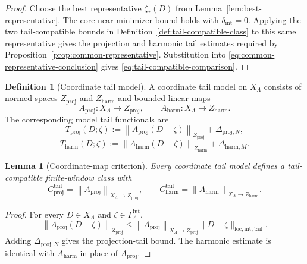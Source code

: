 \documentclass[11pt]{article}
\numberwithin{equation}{section}
\newtheorem{lemma}[lemma]{Lemma}
\theoremstyle{definition}
\newtheorem{definition}[definition]{Definition}
\theoremstyle{remark}
\newcommand{\loc}{\mathrm{loc}}
\newcommand{\intg}{\mathrm{int}}
\newcommand{\tail}{\mathrm{tail}}
\newcommand{\proj}{\mathrm{proj}}
\newcommand{\harm}{\mathrm{harm}}
\newcommand{\norm}[2]{\left\|#1\right\|_{#2}}
\newcommand{\Gammaint}{\Gamma^{\intg}_{\Lambda}}
\begin{document}
\begin{proof}
Choose the best representative $\zeta_*(D)$ from Lemma~\ref{lem:best-representative}.  The core
near-minimizer bound holds with $\delta_{\intg}=0$.  Applying the two tail-compatible
bounds in Definition~\ref{def:tail-compatible-class} to this same representative gives the projection
and harmonic tail estimates required by Proposition~\ref{prop:common-representative}.  Substitution
into \eqref{eq:common-representative-conclusion} gives \eqref{eq:tail-compatible-comparison}.
\end{proof}

\begin{definition}[Coordinate tail model]\label{def:coordinate-tail-model}
A coordinate tail model on $X_\Lambda$ consists of normed spaces $Z_{\proj}$ and
$Z_{\harm}$ and bounded linear maps
\[
        A_{\proj}:X_\Lambda\to Z_{\proj},
        \qquad
        A_{\harm}:X_\Lambda\to Z_{\harm}.
\]
The corresponding model tail functionals are
\[
        T_{\proj}(D;\zeta):=\norm{A_{\proj}(D-\zeta)}{Z_{\proj}}+\Delta_{\proj,N},
\]
\[
        T_{\harm}(D;\zeta):=\norm{A_{\harm}(D-\zeta)}{Z_{\harm}}+\Delta_{\harm,M}.
\]
\end{definition}

\begin{lemma}[Coordinate-map criterion]\label{lem:coordinate-map-criterion}
Every coordinate tail model defines a tail-compatible finite-window class with
\[
        C^{\tail}_{\proj}=\norm{A_{\proj}}{X_\Lambda\to Z_{\proj}},
        \qquad
        C^{\tail}_{\harm}=\norm{A_{\harm}}{X_\Lambda\to Z_{\harm}}.
\]
\end{lemma}

\begin{proof}
For every $D\in X_\Lambda$ and $\zeta\in\Gammaint$,
\[
\norm{A_{\proj}(D-\zeta)}{Z_{\proj}}
\le
\norm{A_{\proj}}{X_\Lambda\to Z_{\proj}}
\|D-\zeta\|_{\loc,\intg,\tail}.
\]
Adding $\Delta_{\proj,N}$ gives the projection-tail bound.  The harmonic estimate is
identical with $A_{\harm}$ in place of $A_{\proj}$.
\end{proof}
\end{document}
